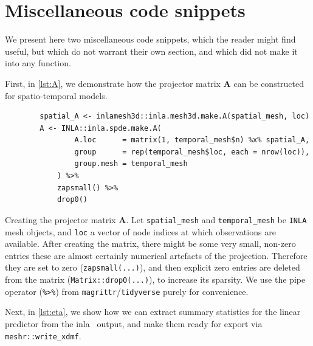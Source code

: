 \documentclass[british]{scrreprt}
\begin{document}
\section{Miscellaneous code snippets}
\label{sec:code-snippets}
We present here two miscellaneous code snippets, which the reader might find useful, but which do not warrant their own section, and which did not make it into any function.

First, in \cref{lst:A}, we demonstrate how the projector matrix \( \symbf{A} \) can be constructed for spatio-temporal models.
\begin{listing}
    \begin{verbatim}
        spatial_A <- inlamesh3d::inla.mesh3d.make.A(spatial_mesh, loc)
        A <- INLA::inla.spde.make.A(
                A.loc      = matrix(1, temporal_mesh$n) %x% spatial_A,
                group      = rep(temporal_mesh$loc, each = nrow(loc)),
                group.mesh = temporal_mesh
            ) %>%
            zapsmall() %>%
            drop0()
    \end{verbatim}
    \caption{Creating the projector matrix \( \symbf{A} \). Let \texttt{spatial\_mesh} and \texttt{temporal\_mesh} be \texttt{INLA} mesh objects, and \texttt{loc} a vector of node indices at which observations are available. After creating the matrix, there might be some very small, non-zero entries\textemdash{} these are almost certainly numerical artefacts of the projection. Therefore they are set to zero (\texttt{zapsmall(...)}), and then explicit zero entries are deleted from the matrix (\texttt{Matrix::drop0(...)}), to increase its sparsity. We use the pipe operator (\texttt{\%>\%}) from \texttt{magrittr}/\texttt{tidyverse} purely for convenience.}
    \label{lst:A}
\end{listing}
Next, in \cref{lst:eta}, we show how we can extract summary statistics for the linear predictor from the \gls{inla}~\cite{RueApproximateBayesianinference2009} output, and make them ready for export via \texttt{meshr::write_xdmf}.
\end{document}
